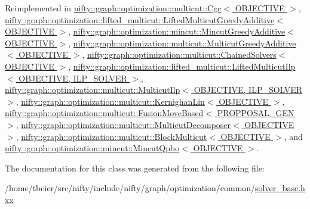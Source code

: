 Reimplemented in \hyperlink{classnifty_1_1graph_1_1optimization_1_1multicut_1_1Cgc_a45593f369b20f4a535bc79835f7d2541}{nifty\+::graph\+::optimization\+::multicut\+::\+Cgc$<$ O\+B\+J\+E\+C\+T\+I\+V\+E $>$}, \hyperlink{classnifty_1_1graph_1_1optimization_1_1lifted__multicut_1_1LiftedMulticutGreedyAdditive_a8a4f4e4800f4b08eadc05c7199faccef}{nifty\+::graph\+::optimization\+::lifted\+\_\+multicut\+::\+Lifted\+Multicut\+Greedy\+Additive$<$ O\+B\+J\+E\+C\+T\+I\+V\+E $>$}, \hyperlink{classnifty_1_1graph_1_1optimization_1_1mincut_1_1MincutGreedyAdditive_ab8ee8cdceb3b1122904a93f250ded1a3}{nifty\+::graph\+::optimization\+::mincut\+::\+Mincut\+Greedy\+Additive$<$ O\+B\+J\+E\+C\+T\+I\+V\+E $>$}, \hyperlink{classnifty_1_1graph_1_1optimization_1_1multicut_1_1MulticutGreedyAdditive_a1e6f6bd6fc0167c1e700481928a5bba4}{nifty\+::graph\+::optimization\+::multicut\+::\+Multicut\+Greedy\+Additive$<$ O\+B\+J\+E\+C\+T\+I\+V\+E $>$}, \hyperlink{classnifty_1_1graph_1_1optimization_1_1multicut_1_1ChainedSolvers_aa66fd3cc2ae9114c7f3ef4acf70356bc}{nifty\+::graph\+::optimization\+::multicut\+::\+Chained\+Solvers$<$ O\+B\+J\+E\+C\+T\+I\+V\+E $>$}, \hyperlink{classnifty_1_1graph_1_1optimization_1_1lifted__multicut_1_1LiftedMulticutIlp_a1e1d76eef565989832313b1488120870}{nifty\+::graph\+::optimization\+::lifted\+\_\+multicut\+::\+Lifted\+Multicut\+Ilp$<$ O\+B\+J\+E\+C\+T\+I\+V\+E, I\+L\+P\+\_\+\+S\+O\+L\+V\+E\+R $>$}, \hyperlink{classnifty_1_1graph_1_1optimization_1_1multicut_1_1MulticutIlp_a741353b34b8997acb8eb502608a8b1ec}{nifty\+::graph\+::optimization\+::multicut\+::\+Multicut\+Ilp$<$ O\+B\+J\+E\+C\+T\+I\+V\+E, I\+L\+P\+\_\+\+S\+O\+L\+V\+E\+R $>$}, \hyperlink{classnifty_1_1graph_1_1optimization_1_1multicut_1_1KernighanLin_a4766290e8d3ef44b73a97357367624f4}{nifty\+::graph\+::optimization\+::multicut\+::\+Kernighan\+Lin$<$ O\+B\+J\+E\+C\+T\+I\+V\+E $>$}, \hyperlink{classnifty_1_1graph_1_1optimization_1_1multicut_1_1FusionMoveBased_ab6e39a48aeea4d53b5bcf040aa43ac08}{nifty\+::graph\+::optimization\+::multicut\+::\+Fusion\+Move\+Based$<$ P\+R\+O\+P\+P\+O\+S\+A\+L\+\_\+\+G\+E\+N $>$}, \hyperlink{classnifty_1_1graph_1_1optimization_1_1multicut_1_1MulticutDecomposer_abadeeec8cacce02560f7e1522f537f0e}{nifty\+::graph\+::optimization\+::multicut\+::\+Multicut\+Decomposer$<$ O\+B\+J\+E\+C\+T\+I\+V\+E $>$}, \hyperlink{classnifty_1_1graph_1_1optimization_1_1multicut_1_1BlockMulticut_a17b76451bb092dd543309bef81afa507}{nifty\+::graph\+::optimization\+::multicut\+::\+Block\+Multicut$<$ O\+B\+J\+E\+C\+T\+I\+V\+E $>$}, and \hyperlink{classnifty_1_1graph_1_1optimization_1_1mincut_1_1MincutQpbo_a7bf3d01da532968da9d23cc4b7955551}{nifty\+::graph\+::optimization\+::mincut\+::\+Mincut\+Qpbo$<$ O\+B\+J\+E\+C\+T\+I\+V\+E $>$}.



The documentation for this class was generated from the following file\+:\begin{DoxyCompactItemize}
\item 
/home/tbeier/src/nifty/include/nifty/graph/optimization/common/\hyperlink{solver__base_8hxx}{solver\+\_\+base.\+hxx}\end{DoxyCompactItemize}
